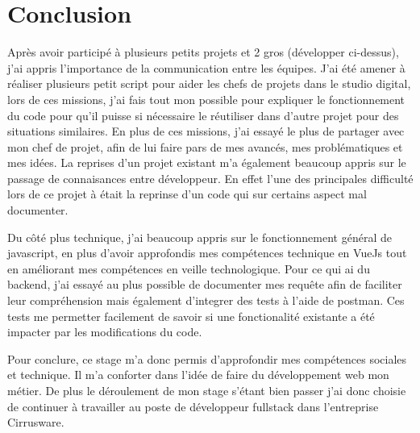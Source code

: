 \section{Conclusion}

Après avoir participé à plusieurs petits projets et 2 gros (développer ci-dessus), j'ai appris l'importance de la communication entre les équipes. J'ai été amener à réaliser plusieurs petit script pour aider les chefs de projets dans le studio digital, lors de ces missions, j'ai fais tout mon possible pour expliquer le fonctionnement du code pour qu'il puisse si nécessaire le réutiliser dans d'autre projet pour des situations similaires. En plus de ces missions, j'ai essayé le plus de partager avec mon chef de projet, afin de lui faire pars de mes avancés, mes problématiques et mes idées. La reprises d'un projet existant m'a également beaucoup appris sur le passage de connaisances entre développeur. En effet l'une des principales difficulté lors de ce projet à était la reprinse d'un code qui sur certains aspect mal documenter. 

Du côté plus technique, j'ai beaucoup appris sur le fonctionnement général de javascript, en plus d'avoir approfondis mes compétences technique en VueJs tout en améliorant mes compétences en veille technologique. Pour ce qui ai du backend, j'ai essayé au plus possible de documenter mes requête afin de faciliter leur compréhension mais également d'integrer des tests à l'aide de postman. Ces tests me permetter facilement de savoir si une fonctionalité existante a été impacter par les modifications du code. 

Pour conclure, ce stage m'a donc permis d'approfondir mes compétences sociales et technique. Il m'a conforter dans l'idée de faire du développement web mon métier. De plus le déroulement de mon stage s'étant bien passer j'ai donc choisie de continuer à travailler au poste de développeur fullstack dans l'entreprise Cirrusware. 